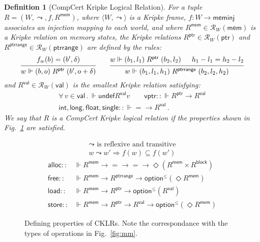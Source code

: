 \documentclass[draft,11pt]{report}
\newtheorem{definition}{Definition}
\newcommand{\kw}[1]{\ensuremath{ \mathsf{#1} }}
\begin{document}
\begin{definition}[CompCert Kripke Logical Relation] \label{def:cklr} %
For a tuple $R = (W, \leadsto, f, R^\kw{mem})$,
where
$\langle W, \leadsto \rangle$ is a Kripke frame,
$f : W \rightarrow \kw{meminj}$
associates an injection mapping to each world, and where
$R^\kw{mem} \in \mathcal{R}_{W}(\kw{mem})$
is a Kripke relation on memory states,
the Kripke relations
$R^\kw{ptr} \in \mathcal{R}_W(\kw{ptr})$ and
$R^\kw{ptrrange} \in \mathcal{R}_W(\kw{ptrrange})$
are defined by the rules:
\[
  \begin{prooftree}
    \hypo{f_w(b) = (b', \delta)}
    \infer1{w \Vdash (b, o) \mathrel{R^\kw{ptr}} (b', o + \delta)}
  \end{prooftree}
  \qquad
  \begin{prooftree}
    \hypo{w \Vdash (b_1, l_1) \mathrel{R^\kw{ptr}} (b_2, l_2)}
    \hypo{h_1 - l_1 = h_2 - l_2}
    \infer2{w \Vdash (b_1, l_1, h_1) \mathrel{R^\kw{ptrrange}} (b_2, l_2, h_2)}
  \end{prooftree}
\]
and
$R^\kw{val} \in \mathcal{R}_W(\kw{val})$
is the smallest Kripke relation satisfying:
\begin{gather*}
  \forall \, v \in \kw{val} \,.\,
    \Vdash \kw{undef} \mathrel{R^\kw{val}} v \qquad
  \kw{vptr} :: {\Vdash R^\kw{ptr} \rightarrow R^\kw{val}} \\
  \kw{int}, \kw{long}, \kw{float}, \kw{single} ::
    {\Vdash {=} \rightarrow R^\kw{val}} \,.
\end{gather*}
We say that $R$ is a \emph{CompCert Kripke logical relation}
if the properties shown in Fig.~\ref{fig:cklr-def} are satisfied.
\end{definition}

\begin{figure} %
  \begin{gather*}
    {\leadsto} \mbox{ is reflexive and transitive} \\
    w \leadsto w' \Rightarrow f(w) \subseteq f(w')
  \end{gather*}
  \begin{align*}
      \kw{alloc} ::
        &\Vdash R^\kw{mem} \rightarrow {=} \rightarrow {=} \rightarrow
        \Diamond (R^\kw{mem} \times R^\kw{block})
      \\
      \kw{free} ::
        &\Vdash R^\kw{mem} \rightarrow R^\kw{ptrrange} \rightarrow
        \kw{option}^\le(\Diamond R^\kw{mem})
      \\
      \kw{load} ::
        &\Vdash R^\kw{mem} \rightarrow R^\kw{ptr} \rightarrow
        \kw{option}^\le(R^\kw{val})
      \\
      \kw{store} ::
        &\Vdash R^\kw{mem} \rightarrow R^\kw{ptr} \rightarrow R^\kw{val} \rightarrow
        \kw{option}^\le(\Diamond R^\kw{mem})
  \end{align*}
  \caption{Defining properties of CKLRs.
    Note the correspondance with
    the types of operations in Fig.~\ref{fig:mm}.}
  \label{fig:cklr-def}
\end{figure}
\end{document}
